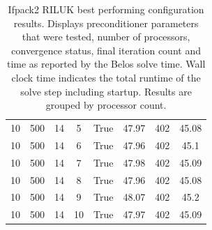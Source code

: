 \begin{table}[H]
{\begin{tabular}{cccccccc}
			10            & 500                             & 14                       & 5            & True             & 47.97                  & 402           & 45.08             \\
			10            & 500                             & 14                       & 6            & True             & 47.96                  & 402           & 45.1              \\
			10            & 500                             & 14                       & 7            & True             & 47.98                  & 402           & 45.09             \\
			10            & 500                             & 14                       & 8            & True             & 47.96                  & 402           & 45.08             \\
			10            & 500                             & 14                       & 9            & True             & 48.07                  & 402           & 45.2              \\
			10            & 500                             & 14                       & 10           & True             & 47.97                  & 402           & 45.09             \\
			\bottomrule
		\end{tabular}
	}%
	\caption{Ifpack2 RILUK best performing configuration results. Displays preconditioner parameters that were tested, number of processors, convergence status, final iteration count and time as reported by the Belos solve time. Wall clock time indicates the total runtime of the solve step including startup. Results are grouped by processor count.}
	\label{tab:ifpack_optimal}

\end{table}



